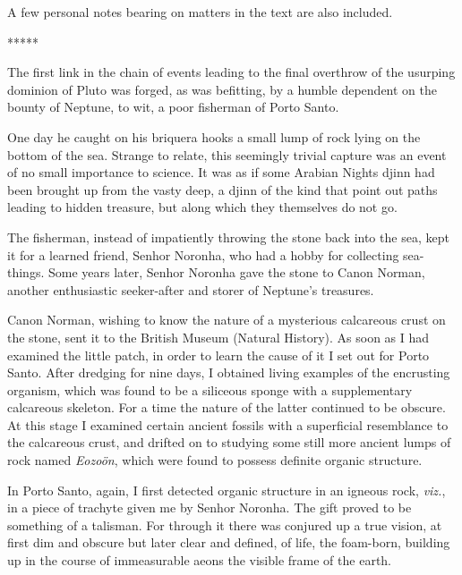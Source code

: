 \documentclass[a4paper, 12pt, oneside]{article}
\begin{document}
A few personal notes bearing on matters in the text are also included.

\centerline{*\hspace{15mm}*\hspace{15mm}*\hspace{15mm}*\hspace{15mm}*}
\bigskip

The first link in the chain of events leading to the final overthrow of the usurping dominion of Pluto was forged, as was befitting, by a humble dependent on the bounty of Neptune, to wit, a poor fisherman of Porto Santo.

One day he caught on his briquera hooks a small lump of rock lying on the bottom of the sea. Strange to relate, this seemingly trivial capture was an event of no small importance to science. It was as if some Arabian Nights djinn had been brought up from the vasty deep, a djinn of the kind that point out paths leading to hidden treasure, but along which they themselves do not go.

The fisherman, instead of impatiently throwing the stone back into the sea, kept it for a learned friend, Senhor Noronha, who had a hobby for collecting sea-things. Some years later, Senhor Noronha gave the stone to Canon Norman, another enthusiastic seeker-after and storer of Neptune's treasures.

Canon Norman, wishing to know the nature of a mysterious calcareous crust on the stone, sent it to the British Museum (Natural History). As soon as I had examined the little patch, in order to learn the cause of it I set out for Porto Santo. After dredging for nine days, I obtained living examples of the encrusting organism, which was found to be a siliceous sponge with a supplementary calcareous skeleton. For a time the nature of the latter continued to be obscure. At this stage I examined certain ancient fossils with a superficial resemblance to the calcareous crust, and drifted on to studying some still more ancient lumps of rock named \emph{Eozoön}, which were found to possess definite organic structure.

In Porto Santo, again, I first detected organic structure in an igneous rock, \emph{viz.}, in a piece of trachyte given me by Senhor Noronha. The gift proved to be something of a talisman. For through it there was conjured up a true vision, at first dim and obscure but later clear and defined, of life, the foam-born, building up in the course of immeasurable aeons the visible frame of the earth.
\end{document}
